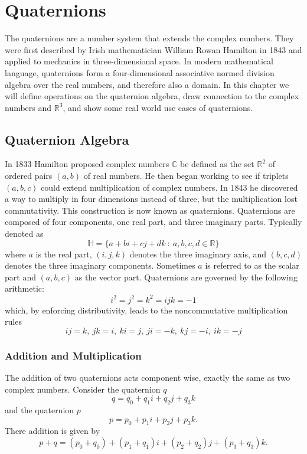 \chapter{Quaternions}
The quaternions are a number system that extends the complex numbers. 
They were first described by Irish mathematician William Rowan Hamilton in 1843 and applied to mechanics in three-dimensional space. 
In modern mathematical language, quaternions form a four-dimensional associative normed division algebra over the real numbers, and therefore also a domain.
In this chapter we will define operations on the quaternion algebra, draw connection to the complex numbers and $\mathbb{R}^3$, and show some real world use cases of quaternions.


\section{Quaternion Algebra}
In 1833 Hamilton proposed complex numbers $\mathbb{C}$ be defined as the set $\mathbb{R}^2$ of ordered pairs $(a, b)$ of real numbers.
He then began working to see if triplets $(a,b,c)$ could extend multiplication of complex numbers.
In 1843 he discovered a way to multiply in four dimensions instead of three, but the multiplication lost commutativity.
This construction is now known as quaternions.
Quaternions are composed of four components, one real part, and three imaginary parts.
Typically denoted as
\begin{equation}
\mathbb{H} = \{a + b\textit{i} + c\textit{j} + d\textit{k}~:~a,b,c,d \in \mathbb{R}\}
\label{eq:quaternion1}
\end{equation}
where $a$ is the real part, $(i,j,k)$ denotes the three imaginary axis, and $(b,c,d)$ denotes the three imaginary components.
Sometimes $a$ is referred to as the scalar part and $(a,b,c)$ as the vector part.
Quaternions are governed by the following arithmetic:
\begin{equation}
i^2=j^2=k^2=ijk=-1
\label{eq:quarternion2}
\end{equation}
which, by enforcing distributivity, leads to the noncommutative multiplication rules
\begin{equation}
ij=k,~jk=i,~ki=j,~ji=-k,~kj=-i,~ik=-j
\label{eq:quarternion3}
\end{equation}


\subsection{Addition and Multiplication}
The addition of two quaternions acts component wise, exactly the same as two complex numbers.
Consider the quaternion $q$
\begin{equation}
q = q_0 + q_1\textit{i} + q_2\textit{j} + q_3\textit{k}
\label{eq:q}
\end{equation}
and the quaternion $p$
\begin{equation}
p = p_0 + p_1\textit{i} + p_2\textit{j} + p_3\textit{k}.
\label{eq:p}
\end{equation}
There addition is given by
\begin{equation}
p + q = (p_0+q_0) + (p_1+q_1)\textit{i} + (p_2+q_2)\textit{j} + (p_3+q_3)\textit{k}.
\label{eq:quataddition}
\end{equation}

